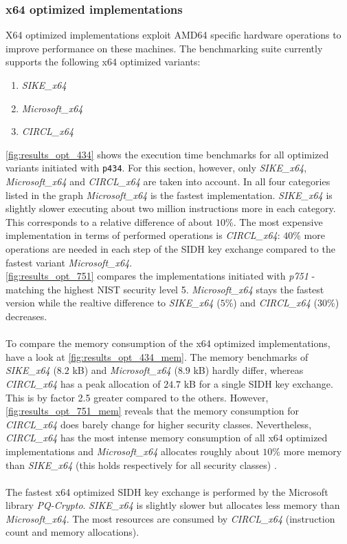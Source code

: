 \subsubsection{x64 optimized implementations}\label{sec:analysis_x64}
X64 optimized implementations exploit AMD64 specific hardware operations to improve performance on these machines. The benchmarking suite currently supports the following x64 optimized variants:
\begin{enumerate}
\item \textit{SIKE\_x64}
\item \textit{Microsoft\_x64}
\item \textit{CIRCL\_x64}
\end{enumerate}
\autoref{fig:results_opt_434} shows the execution time benchmarks for all optimized variants initiated with \texttt{p434}. For this section, however, only \textit{SIKE\_x64}, \textit{Microsoft\_x64} and \textit{CIRCL\_x64} are taken into account. In all four categories listed in the graph \textit{Microsoft\_x64}  is the fastest implementation. \textit{SIKE\_x64} is slightly slower executing about two million instructions more in each category. This corresponds to a relative difference of about $10$\%. The most expensive implementation in terms of performed operations is \textit{CIRCL\_x64}: $40$\% more operations are needed in each step of the SIDH key exchange compared to the fastest variant \textit{Microsoft\_x64}.
\\
\autoref{fig:results_opt_751} compares the implementations initiated with \textit{p751} - matching the highest NIST security level 5. \textit{Microsoft\_x64} stays the fastest version while the realtive difference to \textit{SIKE\_x64} ($5$\%) and \textit{CIRCL\_x64} ($30$\%) decreases.
\\\\
To compare the memory consumption of the x64 optimized implementations, have a look at \autoref{fig:results_opt_434_mem}. The memory benchmarks of \textit{SIKE\_x64} ($8.2$ kB) and \textit{Microsoft\_x64} ($8.9$ kB) hardly differ, whereas \textit{CIRCL\_x64} has a peak allocation of $24.7$ kB for a single SIDH key exchange. This is by factor 2.5 greater compared to the others. However, \autoref{fig:results_opt_751_mem} reveals that the memory consumption for \textit{CIRCL\_x64} does barely change for higher security classes. Nevertheless,  \textit{CIRCL\_x64} has the most intense memory consumption of all x64 optimized implementations and \textit{Microsoft\_x64} allocates roughly about $10$\% more memory than \textit{SIKE\_x64} (this holds respectively for all security classes) .
\\\\
The fastest x64 optimized SIDH key exchange is performed by the Microsoft library \textit{PQ-Crypto}. \textit{SIKE\_x64} is slightly slower but allocates less memory than \textit{Microsoft\_x64}. The most resources are consumed by \textit{CIRCL\_x64} (instruction count and memory allocations).

